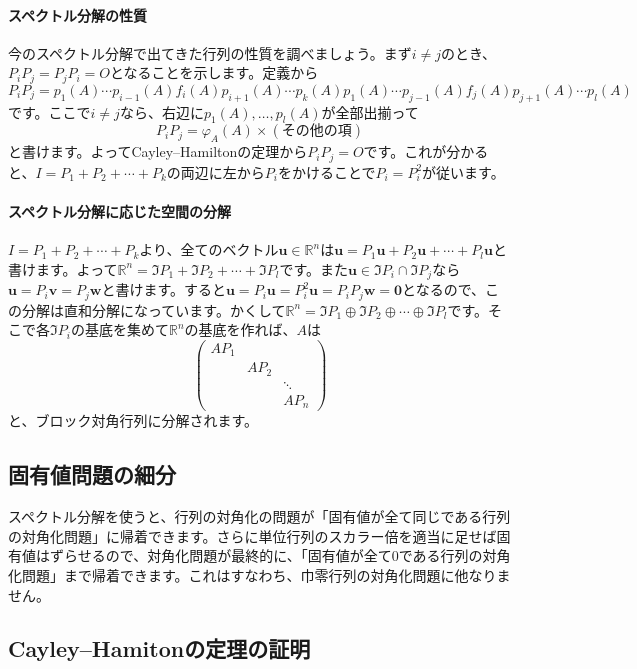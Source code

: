 \paragraph{スペクトル分解の性質}

今のスペクトル分解で出てきた行列の性質を調べましょう。まず$i \neq j$のとき、$P_iP_j = P_jP_i = O$となることを示します。定義から
\[
P_i P_j = p_1(A) \cdots p_{i - 1}(A) f_i(A) p_{i + 1}(A) \cdots p_k(A) p_1(A) \cdots p_{j - 1}(A) f_j(A) p_{j + 1}(A) \cdots p_l(A)
\]
です。ここで$i \neq j$なら、右辺に$p_1(A), \ldots, p_l(A)$が全部出揃って
\[
P_i P_j = \varphi_A(A) \times (\text{その他の項})
\]
と書けます。よってCayley--Hamiltonの定理から$P_i P_j = O$です。これが分かると、$I = P_1 + P_2 + \cdots + P_k$の両辺に左から$P_i$をかけることで$P_i = P_i^2$が従います。

\paragraph{スペクトル分解に応じた空間の分解}

$I = P_1 + P_2 + \cdots + P_k$より、全てのベクトル$\bm{u} \in \mathbb{R}^n$は$\bm{u} = P_1\bm{u} + P_2\bm{u} + \cdots + P_l\bm{u}$と書けます。よって$\mathbb{R}^n = \Im P_1 + \Im P_2 + \cdots + \Im P_l$です。また$\bm{u} \in \Im P_i \cap \Im P_j$なら$\bm{u} = P_i \bm{v} = P_j \bm{w}$と書けます。すると$\bm{u} = P_i \bm{u} = P_i^2 \bm{u} = P_i P_j \bm{w} = \bm{0}$となるので、この分解は直和分解になっています。かくして$\mathbb{R}^n = \Im P_1 \oplus \Im P_2 \oplus \cdots \oplus \Im P_l$です。そこで各$\Im P_i$の基底を集めて$\mathbb{R}^n$の基底を作れば、$A$は
\[
\begin{pmatrix}
AP_1 \\
& AP_2 \\
& & \ddots \\
& & AP_n
\end{pmatrix}
\]
と、ブロック対角行列に分解されます。

\subsection{固有値問題の細分}

スペクトル分解を使うと、行列の対角化の問題が「固有値が全て同じである行列の対角化問題」に帰着できます。さらに単位行列のスカラー倍を適当に足せば固有値はずらせるので、対角化問題が最終的に、「固有値が全て$0$である行列の対角化問題」まで帰着できます。これはすなわち、巾零行列の対角化問題に他なりません。

\subsection{Cayley--Hamitonの定理の証明}

